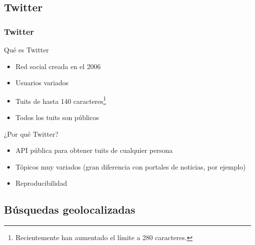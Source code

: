 \subsection{Twitter}
\begin{frame}[c]\frametitle{Twitter}

\begin{block}{Qué es Twitter}
    \begin{itemize}
        \item Red social creada en el 2006
        \item Usuarios variados
        \item Tuits de hasta 140 caracteres{\footnote{Recientemente han aumentado el límite a 280 caracteres.}}
        \item \alert{Todos los tuits son públicos}
    \end{itemize}
\end{block}

\begin{block}{¿Por qué Twitter?}
    \begin{itemize}
        \item API pública para obtener tuits de cualquier persona
        \item Tópicos muy variados (gran diferencia con portales de noticias, por ejemplo)
        \item Reproducibilidad
    \end{itemize}
    
\end{block}


\end{frame}

\subsection{Búsquedas geolocalizadas}

